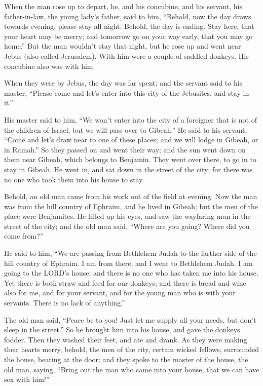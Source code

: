  When the man rose up to depart, he, and his concubine, and
his servant, his father-in-law, the young lady's father, said to him,
``Behold, now the day draws towards evening, please stay all night.
Behold, the day is ending. Stay here, that your heart may be merry; and
tomorrow go on your way early, that you may go home.''  But
the man wouldn't stay that night, but he rose up and went near Jebus
(also called Jerusalem). With him were a couple of saddled donkeys. His
concubine also was with him.

 When they were by Jebus, the day was far spent; and the
servant said to his master, ``Please come and let's enter into this city
of the Jebusites, and stay in it.''

 His master said to him, ``We won't enter into the city of
a foreigner that is not of the children of Israel; but we will pass over
to Gibeah.''  He said to his servant, ``Come and let's draw
near to one of these places; and we will lodge in Gibeah, or in Ramah.''
 So they passed on and went their way; and the sun went
down on them near Gibeah, which belongs to Benjamin.  They
went over there, to go in to stay in Gibeah. He went in, and sat down in
the street of the city; for there was no one who took them into his
house to stay.

 Behold, an old man came from his work out of the field at
evening. Now the man was from the hill country of Ephraim, and he lived
in Gibeah; but the men of the place were Benjamites.  He
lifted up his eyes, and saw the wayfaring man in the street of the city;
and the old man said, ``Where are you going? Where did you come from?''

 He said to him, ``We are passing from Bethlehem Judah to
the farther side of the hill country of Ephraim. I am from there, and I
went to Bethlehem Judah. I am going to the LORD's house; and there is no
one who has taken me into his house.  Yet there is both
straw and feed for our donkeys; and there is bread and wine also for me,
and for your servant, and for the young man who is with your servants.
There is no lack of anything.''

 The old man said, ``Peace be to you! Just let me supply
all your needs, but don't sleep in the street.''  So he
brought him into his house, and gave the donkeys fodder. Then they
washed their feet, and ate and drank.  As they were making
their hearts merry, behold, the men of the city, certain wicked fellows,
surrounded the house, beating at the door; and they spoke to the master
of the house, the old man, saying, ``Bring out the man who came into
your house, that we can have sex with him!''

